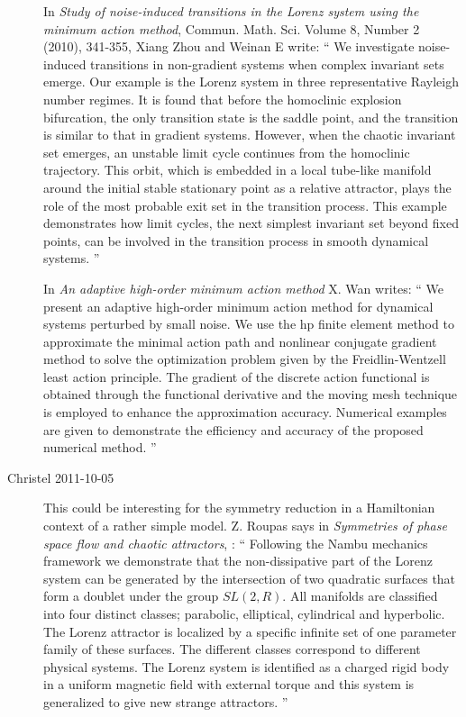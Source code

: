 \begin{description}
In {\em Study of noise-induced transitions in the Lorenz system using the
minimum action method},
Commun. Math. Sci. Volume 8, Number 2 (2010), 341-355,
Xiang Zhou and Weinan E write: ``
We investigate noise-induced transitions in non-gradient systems when
complex invariant sets emerge. Our example is the Lorenz system in three
representative Rayleigh number regimes. It is found that before the
homoclinic explosion bifurcation, the only transition state is the saddle
point, and the transition is similar to that in gradient systems.
However, when the chaotic invariant set emerges, an unstable limit cycle
continues from the homoclinic trajectory. This orbit, which is embedded
in a local tube-like manifold around the initial stable stationary point
as a relative attractor, plays the role of the most probable exit set in
the transition process. This example demonstrates how limit cycles, the
next simplest invariant set beyond fixed points, can be involved in the
transition process in smooth dynamical systems.
''

In {\em An adaptive high-order minimum action method}
X. Wan writes: ``
We present an adaptive high-order minimum
action method for dynamical systems perturbed by small noise. We use the
hp finite element method to approximate the minimal action path and
nonlinear conjugate gradient method to solve the optimization problem
given by the Freidlin-Wentzell least action principle. The gradient of
the discrete action functional is obtained through the functional
derivative and the moving mesh technique is employed to enhance the
approximation accuracy. Numerical examples are given to demonstrate the
efficiency and accuracy of the proposed numerical method.
''

\item[Christel 2011-10-05 ] This could be interesting for the symmetry
reduction in a Hamiltonian context of a rather simple model.
Z. Roupas says in
\emph{Symmetries of phase space flow and chaotic attractors},
 : ``
Following the Nambu mechanics framework we demonstrate that the
non-dissipative part of the Lorenz system can be generated by the
intersection of two quadratic surfaces that form a doublet under the
group $SL(2,R)$. All manifolds are classified into four distinct classes;
parabolic, elliptical, cylindrical and hyperbolic. The Lorenz attractor
is localized by a specific infinite set of one parameter family of these
surfaces. The different classes correspond to different physical systems.
The Lorenz system is identified as a charged rigid body in a uniform
magnetic field with external torque and this system is generalized to
give new strange attractors.
''


\end{description}
